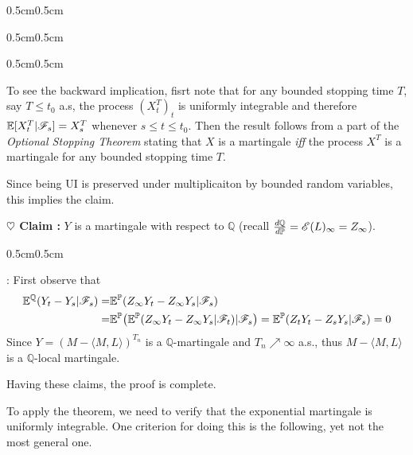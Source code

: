 \documentclass[12pt,a4paper]{article}
\newenvironment{proof}
{\begin{changemargin}{0.5cm}{0.5cm} 
	}%
	{\end{changemargin}
}
\newenvironment{subproof}
{\begin{changemargin}{0.5cm}{0.5cm} 
	}%
	{\end{changemargin}
}
\newenvironment{p}
{\begin{proof} 
	}%
	{\end{proof}
}
\begin{document}
\begin{p}
\begin{subproof}
\begin{subproof}
\quad To see the backward implication, fisrt note that for any bounded stopping time $T$, say $T\leq t_0$ a.s, the process $(X^T_t)_t$ is uniformly integrable and therefore $\mathbb{E}[X^T_t | \mathscr{F}_s] = X^T_s$ whenever $s\leq t\leq t_0$. Then the result follows from a part of the \emph{Optional Stopping Theorem} stating that $X$ is a martingale \emph{iff} the process $X^T$ is a martingale for any bounded stopping time $T$.
\end{subproof}
Since being UI is preserved under multiplicaiton by bounded random variables, this implies the claim.
\end{subproof}

\textbf{$\heartsuit$ Claim :} $Y$ is a martingale with respect to $\mathbb{Q}$ (recall $\frac{d \mathbb{Q}}{d \mathbb{P}} = \mathscr{E} (L)_{\infty} = Z_{\infty}$).
\begin{subproof}
: First observe that
\begin{align*}
\mathbb{E}^{\mathbb{Q}}(Y_t - Y_s | \mathscr{F}_s) =& \mathbb{E}^{\mathbb{P}}(Z_{\infty}Y_t - Z_{\infty} Y_s |\mathscr{F}_s ) \\
=& \mathbb{E}^{\mathbb{P}}\big( \mathbb{E}^{\mathbb{P}}(Z_{\infty}Y_t - Z_{\infty} Y_s |\mathscr{F}_t ) | \mathscr{F}_s \big) = \mathbb{E}^{\mathbb{P}} (Z_t Y_t - Z_s Y_s | \mathscr{F}_s) =0
\end{align*}
Since $Y = (M - \langle M, L \rangle)^{T_n}$ is a $\mathbb{Q}$-martingale and $T_n \nearrow \infty$ a.s., thus $M - \langle M, L \rangle$ is a $\mathbb{Q}$-local martingale.
\end{subproof}
Having these claims, the proof is complete.

\eop
\end{p}
\s

To apply the theorem, we need to verify that the exponential martingale is uniformly integrable. One criterion for doing this is the following, yet not the most general one.
\s
\end{document}

